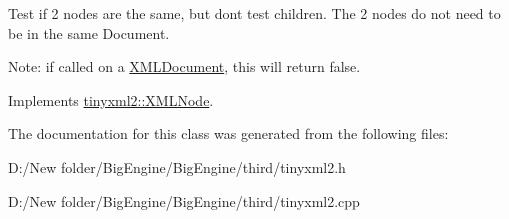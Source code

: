 Test if 2 nodes are the same, but don\textquotesingle{}t test children. The 2 nodes do not need to be in the same Document.

Note\+: if called on a \mbox{\hyperlink{classtinyxml2_1_1_x_m_l_document}{X\+M\+L\+Document}}, this will return false. 

Implements \mbox{\hyperlink{classtinyxml2_1_1_x_m_l_node_a7ce18b751c3ea09eac292dca264f9226}{tinyxml2\+::\+X\+M\+L\+Node}}.



The documentation for this class was generated from the following files\+:\begin{DoxyCompactItemize}
\item 
D\+:/\+New folder/\+Big\+Engine/\+Big\+Engine/third/tinyxml2.\+h\item 
D\+:/\+New folder/\+Big\+Engine/\+Big\+Engine/third/tinyxml2.\+cpp\end{DoxyCompactItemize}
